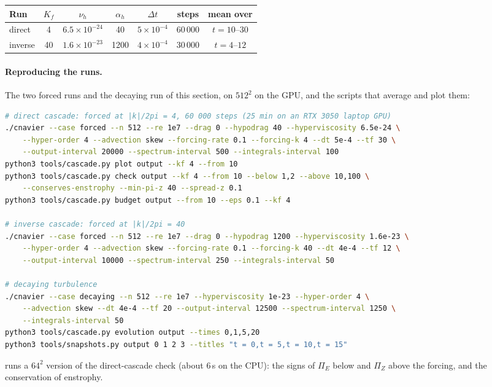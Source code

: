 \documentclass[11pt,a4paper]{article}
\newcommand{\code}[1]{\texttt{\detokenize{#1}}}
\begin{document}
\begin{center}\small
\begin{tabular}{lcccccc}
\toprule
Run & $K_f$ & $\nu_h$ & $\alpha_h$ & $\Delta t$ & steps & mean over \\
\midrule
direct & 4 & $6.5\times10^{-24}$ & 40 & $5\times10^{-4}$ & 60\,000 & $t=10$--$30$ \\
inverse & 40 & $1.6\times10^{-23}$ & 1200 & $4\times10^{-4}$ & 30\,000 & $t=4$--$12$ \\
\bottomrule
\end{tabular}
\end{center}

\paragraph{Reproducing the runs.}  The two forced runs and the decaying run of this section, on $512^2$ on the GPU, and the scripts that average and plot them:
\begin{lstlisting}[language=bash]
# direct cascade: forced at |k|/2pi = 4, 60 000 steps (25 min on an RTX 3050 laptop GPU)
./cnavier --case forced --n 512 --re 1e7 --drag 0 --hypodrag 40 --hyperviscosity 6.5e-24 \
    --hyper-order 4 --advection skew --forcing-rate 0.1 --forcing-k 4 --dt 5e-4 --tf 30 \
    --output-interval 20000 --spectrum-interval 500 --integrals-interval 100
python3 tools/cascade.py plot output --kf 4 --from 10
python3 tools/cascade.py check output --kf 4 --from 10 --below 1,2 --above 10,100 \
    --conserves-enstrophy --min-pi-z 40 --spread-z 0.1
python3 tools/cascade.py budget output --from 10 --eps 0.1 --kf 4

# inverse cascade: forced at |k|/2pi = 40
./cnavier --case forced --n 512 --re 1e7 --drag 0 --hypodrag 1200 --hyperviscosity 1.6e-23 \
    --hyper-order 4 --advection skew --forcing-rate 0.1 --forcing-k 40 --dt 4e-4 --tf 12 \
    --output-interval 10000 --spectrum-interval 250 --integrals-interval 50

# decaying turbulence
./cnavier --case decaying --n 512 --re 1e7 --hyperviscosity 1e-23 --hyper-order 4 \
    --advection skew --dt 4e-4 --tf 20 --output-interval 12500 --spectrum-interval 1250 \
    --integrals-interval 50
python3 tools/cascade.py evolution output --times 0,1,5,20
python3 tools/snapshots.py output 0 1 2 3 --titles "t = 0,t = 5,t = 10,t = 15"
\end{lstlisting}
\code{make regression} runs a $64^2$ version of the direct-cascade check (about 6\,s on the CPU): the signs of $\Pi_E$ below and $\Pi_Z$ above the forcing, and the conservation of enstrophy.
\end{document}
